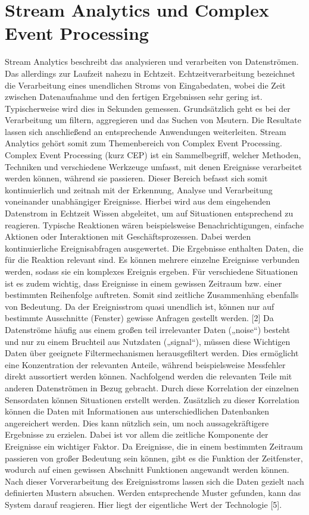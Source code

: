 \section{Stream Analytics und Complex Event Processing}
Stream Analytics beschreibt das analysieren und verarbeiten von Datenströmen. Das allerdings zur Laufzeit nahezu in Echtzeit. Echtzeitverarbeitung bezeichnet die Verarbeitung eines unendlichen Stroms von Eingabedaten, wobei die Zeit zwischen Datenaufnahme und den fertigen Ergebnissen sehr gering ist. Typischerweise wird dies in Sekunden gemessen. Grundsätzlich geht es bei der Verarbeitung um filtern, aggregieren und das Suchen von Msutern. Die Resultate lassen sich anschließend an entsprechende Anwendungen weiterleiten.  Stream Analytics gehört somit zum Themenbereich von Complex Event Processing. 
Complex Event Processing (kurz CEP) ist ein Sammelbegriff, welcher Methoden, Techniken und verschiedene Werkzeuge umfasst, mit denen Ereignisse verarbeitet werden können, während sie passieren. Dieser Bereich befasst sich somit kontinuierlich und zeitnah mit der Erkennung, Analyse und Verarbeitung voneinander unabhängiger Ereignisse. Hierbei wird aus dem eingehenden Datenstrom in Echtzeit Wissen abgeleitet, um auf Situationen entsprechend zu reagieren. Typische Reaktionen wären beispielsweise Benachrichtigungen, einfache Aktionen oder Interaktionen mit Geschäftsprozessen. 
Dabei werden kontinuierliche Ereignisabfragen ausgewertet. Die Ergebnisse enthalten Daten, die für die Reaktion relevant sind. Es können mehrere einzelne Ereignisse verbunden werden, sodass sie ein komplexes Ereignis ergeben. Für verschiedene Situationen ist es zudem wichtig, dass Ereignisse in einem gewissen Zeitraum bzw. einer bestimmten Reihenfolge auftreten. Somit sind zeitliche Zusammenhäng ebenfalls von Bedeutung. Da der Ereignisstrom quasi unendlich ist, können nur auf bestimmte Ausschnitte (Fenster) gewisse Anfragen gestellt werden. [2]
Da Datenströme häufig aus einem großen teil irrelevanter Daten („noise“) besteht und nur zu einem Bruchteil aus Nutzdaten („signal“), müssen diese Wichtigen Daten über geeignete Filtermechanismen herausgefiltert werden. Dies ermöglicht eine Konzentration der relevanten Anteile, während beispielsweise Messfehler direkt aussortiert werden können. Nachfolgend werden die relevanten Teile mit anderen Datenströmen in Bezug gebracht. Durch diese Korrelation der einzelnen Sensordaten können Situationen erstellt werden. Zusätzlich zu dieser Korrelation können die Daten mit Informationen aus unterschiedlichen Datenbanken angereichert werden. Dies kann nützlich sein, um noch aussagekräftigere Ergebnisse zu erzielen. Dabei ist vor allem die zeitliche Komponente der Ereignisse ein wichtiger Faktor. Da Ereignisse, die in einem bestimmten Zeitraum passieren von großer Bedeutung sein können, gibt es die Funktion der Zeitfenster, wodurch auf einen gewissen Abschnitt Funktionen angewandt werden können. Nach dieser Vorverarbeitung des Ereignisstroms lassen sich die Daten gezielt nach definierten Mustern absuchen. Werden entsprechende Muster gefunden, kann das System darauf reagieren. Hier liegt der eigentliche Wert der Technologie [5].



\ifCLASSOPTIONcaptionsoff
  \newpage
\fi